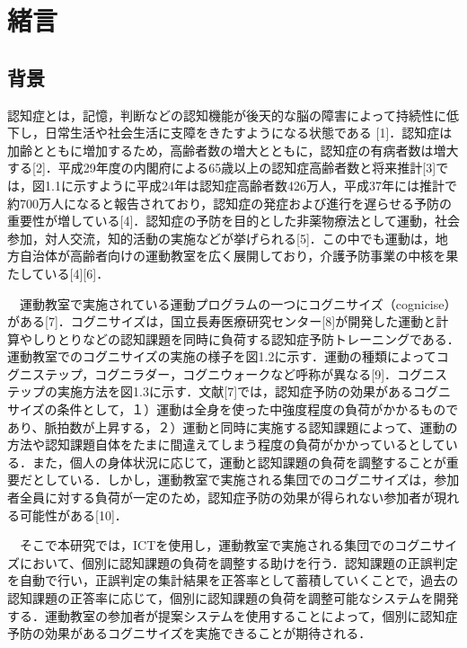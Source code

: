 \chapter{緒言}
\thispagestyle{myheadings}

\section{背景}
認知症とは，記憶，判断などの認知機能が後天的な脳の障害によって持続性に低下し，日常生活や社会生活に支障をきたすようになる状態である [1]．認知症は加齢とともに増加するため，高齢者数の増大とともに，認知症の有病者数は増大する[2]．平成29年度の内閣府による65歳以上の認知症高齢者数と将来推計[3]では，図1.1に示すように平成24年は認知症高齢者数426万人，平成37年には推計で約700万人になると報告されており，認知症の発症および進行を遅らせる予防の重要性が増している[4]．認知症の予防を目的とした非薬物療法として運動，社会参加，対人交流，知的活動の実施などが挙げられる[5]．この中でも運動は，地方自治体が高齢者向けの運動教室を広く展開しており，介護予防事業の中核を果たしている[4][6]．

　運動教室で実施されている運動プログラムの一つにコグニサイズ（cognicise）がある[7]．コグニサイズは，国立長寿医療研究センター[8]が開発した運動と計算やしりとりなどの認知課題を同時に負荷する認知症予防トレーニングである．運動教室でのコグニサイズの実施の様子を図1.2に示す．運動の種類によってコグニステップ，コグニラダー，コグニウォークなど呼称が異なる[9]．コグニステップの実施方法を図1.3に示す．文献[7]では，認知症予防の効果があるコグニサイズの条件として，１）運動は全身を使った中強度程度の負荷がかかるものであり、脈拍数が上昇する，２）運動と同時に実施する認知課題によって、運動の方法や認知課題自体をたまに間違えてしまう程度の負荷がかかっているとしている．また，個人の身体状況に応じて，運動と認知課題の負荷を調整することが重要だとしている．しかし，運動教室で実施される集団でのコグニサイズは，参加者全員に対する負荷が一定のため，認知症予防の効果が得られない参加者が現れる可能性がある[10]．

　そこで本研究では，ICTを使用し，運動教室で実施される集団でのコグニサイズにおいて、個別に認知課題の負荷を調整する助けを行う．認知課題の正誤判定を自動で行い，正誤判定の集計結果を正答率として蓄積していくことで，過去の認知課題の正答率に応じて，個別に認知課題の負荷を調整可能なシステムを開発する．運動教室の参加者が提案システムを使用することによって，個別に認知症予防の効果があるコグニサイズを実施できることが期待される．

